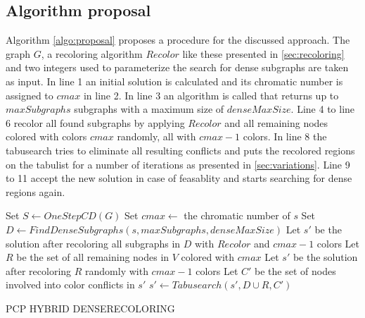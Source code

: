 \subsection{Algorithm proposal}
Algorithm \ref{algo:proposal} proposes a procedure for the discussed approach. The graph $G$, a recoloring algorithm $\mathit{Recolor}$ like these presented in \ref{sec:recoloring} and two integers used to parameterize the search for dense subgraphs are taken as input. In line 1 an initial solution is calculated and its chromatic number is assigned to $cmax$ in line 2. In line 3 an algorithm is called that returns up to $\mathit{maxSubgraphs}$ subgraphs with a maximum size of $\mathit{denseMaxSize}$. Line 4 to line 6 recolor all found subgraphs by applying $\mathit{Recolor}$ and all remaining nodes colored with colors $\mathit{cmax}$ randomly, all with $\mathit{cmax-1}$ colors. In line 8 the tabusearch tries to eliminate all resulting conflicts and puts the recolored regions on the tabulist for a number of iterations as presented in \ref{sec:variations}. Line 9 to 11 accept the new solution in case of feasablity and starts searching for dense regions again.

\begin{algorithm}
Set $S \gets \mathit{OneStepCD}(G)$\;
Set $cmax \gets$ the chromatic number of $s$\;
Set $D \gets \mathit{FindDenseSubgraphs}( s, \mathit{maxSubgraphs}, \mathit{denseMaxSize}) $\;
Let $s'$ be the solution after recoloring all subgraphs in $D$ with $\mathit{Recolor}$ and $cmax-1$ colors\;
Let $R$ be the set of all remaining nodes in $V$ colored with $cmax$\;
Let $s'$ be the solution after recoloring $R$ randomly with $cmax-1$ colors\;
Let $C'$ be the set of nodes involved into color conflicts in $s'$\;
$s' \gets \mathit{Tabusearch}(s', D \cup R, C')$\;
\;
\caption{PCP HYBRID DENSERECOLORING}
\label{algo:proposal}
\end{algorithm}




